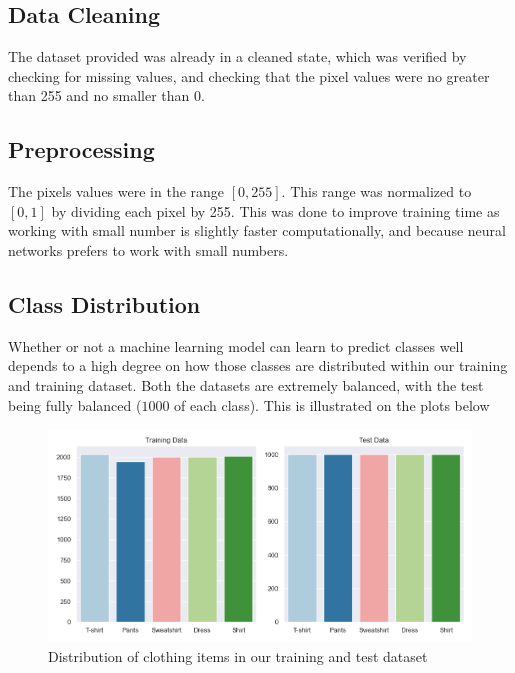 \subsection{Data Cleaning}
The dataset provided was already in a cleaned state, which was verified by checking for missing values,
and checking that the pixel values were no greater than 255 and no smaller than 0.

\subsection{Preprocessing}
The pixels values were in the range $[0, 255]$.
This range was normalized to $[0, 1]$ by dividing each pixel by 255.
This was done to improve training time as working with small number is slightly faster computationally, and because neural networks prefers to work with small numbers.



\subsection{Class Distribution}
Whether or not a machine learning model can learn to predict classes well depends to a high degree on how those classes are distributed within our training and training dataset.
Both the datasets are extremely balanced, with the test being fully balanced ($1000$ of each class).
This is illustrated on the plots below

\begin{figure}[ht]
\centering
\includegraphics[scale=0.45]{figures_for_report/class_distribution}
\captionsetup{justification=centering,margin=2cm}
\caption{Distribution of clothing items in our training and test dataset}
\end{figure}

